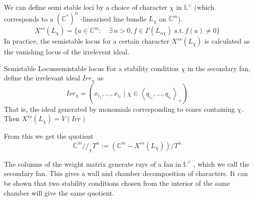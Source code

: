 We can define semi stable loci by a choice of character $\chi$ in $\mathbb{L}^\vee$ (which corresponds to a $(\mathbb{C}^*)^n$ -linearised line bundle $L_\chi$ on $\mathbb{C}^{m}$). $$X^{ss}(L_\chi) = \{ a \in \mathbb{C}^{m}: \quad \exists\, n>0, f\in \Gamma(L_{n\chi})\,\,\text{s.t.} \,f(a)\neq 0 \}$$ In practice, the semistable locus for a certain character $X^{ss}(L_\chi)$ is calculated as the vanishing locus of the irrelevent ideal.

\begin{definition}{Semistable Locus}{semistable locus}
	For a stability condition $\chi$ in the secondary fan, define the irrelevant ideal $Irr_\chi$ as $$
Irr_{\chi}= (x_{i_{1}},\dots,x_{i_{r}} \mid \chi \in \left< q_{i_{1}},\dots,q_{i_{r}}\right>_{+} )
$$ That is, the ideal generated by monomials corresponding to cones containing $\chi$. 
Then $X^{ss} (L_{\chi}) = V(Irr)$
\end{definition}

From this we get the quotient $$
\mathbb{C}^{m}//_{\chi}T^{n}:= \left(\mathbb{C}^{m}-X^{ss}(L_{\chi})\right)  /T^n
$$

The columns of the weight matrix generate rays of a fan in $\mathbb{L}^\vee$ , which we call the secondary fan. This gives a wall and chamber decomposition of characters. It can be shown that two stability conditions chosen from the interior of the same chamber will give the same quotient. 

